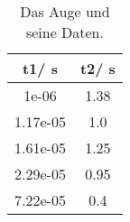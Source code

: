 \begin{table}\caption{Das Auge und seine Daten.}
\label{tabd}
\centering
{}
\begin{tabular}{S[]S[]} 
\toprule
{t1/ \si{\second}} & {t2/ \si{\second}}\\
\midrule
1e-06 & 1.38\\
1.17e-05 & 1.0\\
1.61e-05 & 1.25\\
2.29e-05 & 0.95\\
7.22e-05 & 0.4\\
\bottomrule
\end{tabular}\end{table}